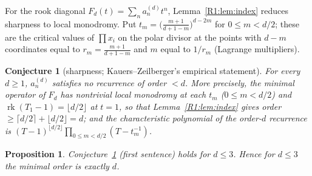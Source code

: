 \documentclass[11pt]{amsart}
\newtheorem{proposition}[theorem]{Proposition}
\newtheorem{conjecture}[theorem]{Conjecture}
\theoremstyle{definition}
\theoremstyle{remark}
\begin{document}
For the rook diagonal $F_d(t)=\sum_na^{(d)}_nt^n$, Lemma~\ref{R1:lem:index} reduces sharpness
to local monodromy. Put $t_m=\bigl(\frac{m+1}{d+1-m}\bigr)^{d-2m}$ for $0\le m<d/2$; these
are the critical values of $\prod x_i$ on the polar divisor at the points with $d-m$
coordinates equal to $r_m=\frac{m+1}{d+1-m}$ and $m$ equal to $1/r_m$ (Lagrange multipliers).

\begin{conjecture}[sharpness; Kauers--Zeilberger's empirical statement]\label{R1:conj:sharp}
For every $d\ge1$, $a^{(d)}_n$ satisfies no recurrence of order $<d$. More precisely, the
minimal operator of $F_d$ has nontrivial local monodromy at each $t_m$ ($0\le m<d/2$) and
$\operatorname{rk}(T_1-1)=\lfloor d/2\rfloor$ at $t=1$, so that Lemma~\ref{R1:lem:index}
gives order $\ge\lceil d/2\rceil+\lfloor d/2\rfloor=d$; and the characteristic polynomial of
the order-$d$ recurrence is $(T-1)^{\lfloor d/2\rfloor}\prod_{0\le m<d/2}(T-t_m^{-1})$.
\end{conjecture}

\begin{proposition}\label{R1:prop:small}
Conjecture~\ref{R1:conj:sharp} (first sentence) holds for $d\le3$. Hence for $d\le3$ the
minimal order is exactly $d$.
\end{proposition}
\end{document}
